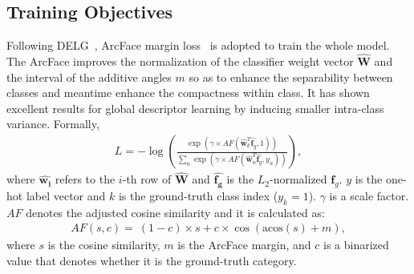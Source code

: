 \documentclass[letterpaper]{article} \usepackage{aaai22}  \usepackage{times}  \usepackage{helvet}  \usepackage{courier}  \usepackage[hyphens]{url}  \usepackage{graphicx} \urlstyle{rm} \def\UrlFont{\rm}  \usepackage{natbib}  \usepackage{caption} \DeclareCaptionStyle{ruled}{labelfont=normalfont,labelsep=colon,strut=off} \frenchspacing  \setlength{\pdfpagewidth}{8.5in}  \setlength{\pdfpageheight}{11in}  \usepackage{algorithm}
\begin{document}
\subsection{Training Objectives}
Following DELG~\cite{cao2020unifying}, ArcFace margin loss~\cite{Deng_2019_CVPR} is adopted to train the whole model.
The ArcFace improves the normalization of the classifier weight vector $\hat{\bm{W}}$ and the interval of the additive angles $m$ so as to enhance the separability between classes and meantime enhance the compactness within class. 
It has shown excellent results for global descriptor learning by inducing smaller intra-class variance. Formally,
\begin{eqnarray}\label{ArcFace}
	\mathit{L} = -\log\left ( \frac{\exp\left ( \gamma \times {AF} \left (  \bm{\hat{w}}_{k}^{T}\hat{\bm{f}_g},1\right )\right )}{\sum_{n}^{}\exp\left ( \gamma \times {AF} \left (  \bm{\hat{w}}_{n}^{T}\hat{\bm{f}_g},y_{n}\right )\right )} \right ),
\end{eqnarray}
where $\bm{\hat{w_i}}$ refers to the $i$-th row of $\bm{\hat{W}}$ and $\bm{\hat{f_g}}$ is the $L_2$-normalized $\bm{f}_g$. $y$ is the one-hot label vector and $k$ is the ground-truth class index ($y_k=1$). $\gamma$ is a scale factor. 
$AF$ denotes the adjusted cosine similarity and it is calculated as:
\begin{eqnarray}\label{AF_COS}
	{AF}\left ( \mathit{s,c} \right ) =\ (1-c) \times s + c \times \cos\left ( \text{acos}\left ( s \right ) +m \right ),
\end{eqnarray}
where $s$ is the cosine similarity, $m$ is the ArcFace margin, and $c$ is a binarized value that denotes whether it is the ground-truth category.
\end{document}

